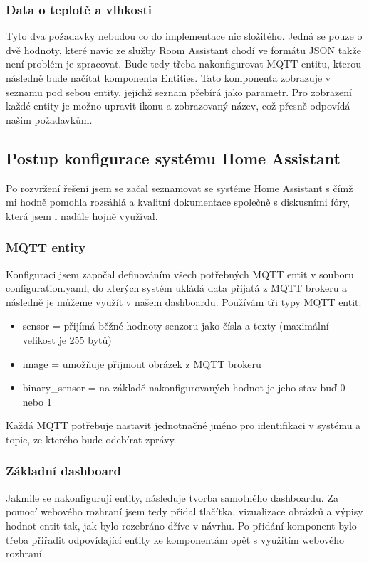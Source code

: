 \subsubsection*{Data o teplotě a vlhkosti}
Tyto dva požadavky nebudou co do implementace nic složitého.
Jedná se pouze o dvě hodnoty, které navíc ze služby Room Assistant chodí ve formátu JSON takže není problém je zpracovat.\newline
Bude tedy třeba nakonfigurovat MQTT entitu, kterou následně bude načítat komponenta Entities.
Tato komponenta zobrazuje v seznamu pod sebou entity, jejichž seznam přebírá jako parametr.
Pro zobrazení každé entity je možno upravit ikonu a zobrazovaný název, což přesně odpovídá našim požadavkům.

\subsection*{Postup konfigurace systému Home Assistant}
Po rozvržení řešení jsem se začal seznamovat se systéme Home Assistant s čímž mi hodně pomohla rozsáhlá a kvalitní dokumentace společně s diskusními fóry, která jsem i nadále hojně využíval.
\subsubsection*{MQTT entity}
Konfiguraci jsem započal definováním všech potřebných MQTT entit v souboru configuration.yaml, do kterých systém ukládá data přijatá z MQTT brokeru a následně je můžeme využít v našem dashboardu.
Používám tři typy MQTT entit.
\begin{itemize}
    \item sensor = přijímá běžné hodnoty senzoru jako čísla a texty (maximální velikost je 255 bytů)
    \item image = umožňuje přijmout obrázek z MQTT brokeru
    \item binary\_sensor = na základě nakonfigurovaných hodnot je jeho stav buď 0 nebo 1
\end{itemize}
Každá MQTT potřebuje nastavit jednotnačné jméno pro identifikaci v systému a topic, ze kterého bude odebírat zprávy.


\subsubsection*{Základní dashboard}
Jakmile se nakonfigurují entity, následuje tvorba samotného dashboardu.
Za pomocí webového rozhraní jsem tedy přidal tlačítka, vizualizace obrázků a výpisy hodnot entit tak, jak bylo rozebráno dříve v návrhu.
Po přidání komponent bylo třeba přiřadit odpovídající entity ke komponentám opět s využitím webového rozhraní.

